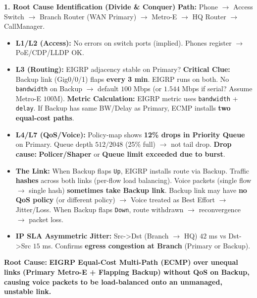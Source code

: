 \documentclass[11pt]{article}
\begin{document}
\begin{exoresolu}
\noindent\textbf{1. Root Cause Identification (Divide \& Conquer)}
\textbf{Path:} Phone $\rightarrow$ Access Switch $\rightarrow$ Branch Router (WAN Primary) $\rightarrow$ Metro-E $\rightarrow$ HQ Router $\rightarrow$ CallManager.
\begin{itemize}
    \item \textbf{L1/L2 (Access):} No errors on switch ports (implied). Phones register $\rightarrow$ PoE/CDP/LLDP OK.
    \item \textbf{L3 (Routing):} EIGRP adjacency stable on Primary? \textbf{Critical Clue:} Backup link (Gig0/0/1) flaps \textbf{every 3 min}. EIGRP runs on both. No \texttt{bandwidth} on Backup $\rightarrow$ default $100$ Mbps (or $1.544$ Mbps if serial? Assume Metro-E $100$M). \textbf{Metric Calculation:} EIGRP metric uses \texttt{bandwidth} + \texttt{delay}. If Backup has same BW/Delay as Primary, ECMP installs \textbf{two equal-cost paths}.
    \item \textbf{L4/L7 (QoS/Voice):} Policy-map shows \textbf{12\% drops in Priority Queue} on Primary. Queue depth $512/2048$ (25\% full) $\rightarrow$ not tail drop. \textbf{Drop cause:} \textbf{Policer/Shaper} or \textbf{Queue limit exceeded due to burst}.
    \item \textbf{The Link:} When Backup flaps \texttt{Up}, EIGRP installs route via Backup. Traffic \textbf{hashes} across both links (per-flow load balancing). Voice packets (single flow $\rightarrow$ single hash) \textbf{sometimes take Backup link}. Backup link may have \textbf{no QoS policy} (or different policy) $\rightarrow$ Voice treated as Best Effort $\rightarrow$ Jitter/Loss. When Backup flaps \texttt{Down}, route withdrawn $\rightarrow$ reconvergence $\rightarrow$ packet loss.
    \item \textbf{IP SLA Asymmetric Jitter:} Src->Dst (Branch $\rightarrow$ HQ) $42$ ms vs Dst->Src $15$ ms. Confirms \textbf{egress congestion at Branch} (Primary or Backup).
\end{itemize}
\textbf{Root Cause:} \textbf{EIGRP Equal-Cost Multi-Path (ECMP) over unequal links (Primary Metro-E + Flapping Backup) without QoS on Backup, causing voice packets to be load-balanced onto an unmanaged, unstable link.}


\end{exoresolu}
\end{document}
